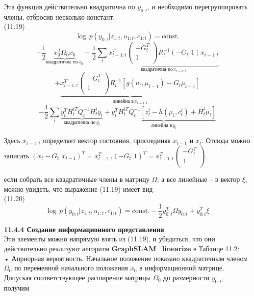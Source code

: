 \documentclass[10pt,a4paper]{article}
\begin{document}
Эта функция действительно квадратична по $y_{0:t}$, и необходимо перегруппировать члены, отбросив несколько констант.\\

(11.19)
$$\log\,p(y_{0:t}|z_{1:t},u_{1:t},c_{1:t})=\text{const.}$$
$$-\frac{1}{2}\underbrace{x_0^T\varOmega_0x_0}_{\text{квадратична по}\,x_0}-\frac{1}{2}\sum_t\underbrace{{x_{t-1:t}^T}
\left(\begin{array}{c}-G_t^T\\
1\\
\end{array} \right)R_t^{-1}(-G_t\,\,1)x_{t-1:t}}_{\text{квадратична по}\,x_{t-1:t}}$$
$$+\underbrace {x_{t-1:t}^T\left(\begin{array}{c}-G_t^T\\
1\\
\end{array} \right)R_t^{-1}[g(u_t,\mu_{t-1})-G_t\mu_{t-1}]}_{\text{линейна в}\,x_{t-1:t}}$$
$$-\frac{1}{2}\sum_i\underbrace{y_t^TH_t^{iT}Q_t^{-1}H_t^iy_t}_{\text{квадратична по}\,y_t}+\underbrace{y_t^TH_t^{iT}Q_t^{-1}[z_t^i-h(\mu_t,c_t^i)+H_t^i\mu_t]}_{\text{линейна в}\,y_t}$$

Здесь $x_{t-1:t}$ определяет вектор состояния, присоединяя $x_{t-1}$ и $x_t$. Отсюда можно записать $(x_t-G_t\,\,x_{t-1})^T=x_{t-1:t}^T(-G_t\,\,1)^T=x_{t-1:t}^T\left(\begin{array}{c}-G_t^T\\
1\\
\end{array} \right)$.

если собрать все квадратичные члены в матрицу $\varOmega$, а все линейные – в вектор $\xi$, можно увидеть, что выражение (11.19) имеет вид\\

(11.20)
$$\log\,p(y_{0:t}|z_{1:t},u_{1:t},c_{1:t})=\text{const.}-\frac{1}{2}y_{0:t}^T\varOmega y_{0:t}+y_{0:t}^T \xi$$

\textbf{11.4.4	Создание информационного представления}\\

Эти элементы можно напрямую взять из (11.19), и убедиться, что они действительно реализуют алгоритм \textbf{GraphSLAM\_linearize} в Таблице 11.2:\\

•	Априорная вероятность. Начальное положение показано квадратичным членом $\varOmega_0$ по переменной начального положения $x_0$ в информационной матрице. Допуская соответствующее расширение матрицы $\varOmega_0$ до размерности $y_{0:t}$, получим\\
\end{document}
